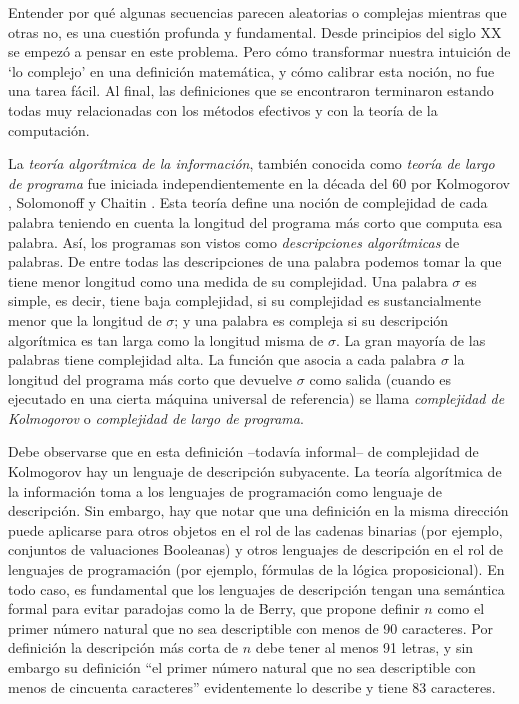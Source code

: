 Entender por qué
algunas secuencias parecen aleatorias o complejas mientras que otras no, es una cuestión
profunda y fundamental. Desde principios del siglo {\small XX} se
empezó a pensar en este problema. Pero cómo transformar nuestra
intuición de `lo complejo' en una definición matemática, y cómo calibrar esta noción, no fue una tarea fácil. 
Al final, las definiciones que se
encontraron terminaron estando todas muy relacionadas con los métodos efectivos y con la 
teoría de la computación.


La {\em teoría algorítmica de la información}, también
conocida como {\em teoría de largo de programa} fue iniciada
independientemente en la década del 60 por Kolmogorov \cite{kolmogorov1965three},
Solomonoff \cite{solomonoff1964formal} y Chaitin \cite{chaitin1969length}. 
Esta teoría define una
noción de complejidad de cada palabra teniendo en cuenta la longitud
del programa más corto que computa esa palabra. Así, los programas
son vistos como {\em descripciones algorítmicas} de palabras. De
entre todas las descripciones de una palabra podemos tomar la que
tiene menor longitud como una medida de su complejidad. Una palabra
$\sigma$ es simple, es decir, tiene baja complejidad, si su
complejidad es sustancialmente menor que la longitud de $\sigma$; y
una palabra es compleja si su descripción algorítmica es tan larga
como la longitud misma de $\sigma$. La gran mayoría
de las palabras tiene complejidad alta. La función que asocia a cada
palabra $\sigma$ la longitud del programa más corto que devuelve
$\sigma$ como salida (cuando es ejecutado en una cierta máquina
universal de referencia) se llama {\em complejidad de Kolmogorov} o
{\em complejidad de largo de programa}.

Debe
observarse que en esta definición --todavía informal-- 
de complejidad de Kolmogorov hay
un lenguaje de descripción subyacente. La teoría algorítmica de la información
toma a los lenguajes de programación como lenguaje de descripción. Sin embargo, 
hay que notar que una definición en la misma dirección puede aplicarse para 
otros objetos en el rol de las cadenas binarias (por ejemplo, conjuntos de valuaciones 
Booleanas) y otros lenguajes de descripción en el rol de lenguajes de programación
(por ejemplo, fórmulas de la lógica proposicional). En todo caso, es fundamental
que los lenguajes de descripción tengan una semántica formal para evitar paradojas
como la de Berry, que propone definir $n$ como el primer número natural que no sea 
descriptible con menos de 90 caracteres. Por definición la descripción más corta de $n$ debe tener 
al menos 91 letras, y sin embargo su definición ``el primer número natural que no sea 
descriptible con menos de cincuenta caracteres'' evidentemente lo describe y tiene 83 caracteres.

